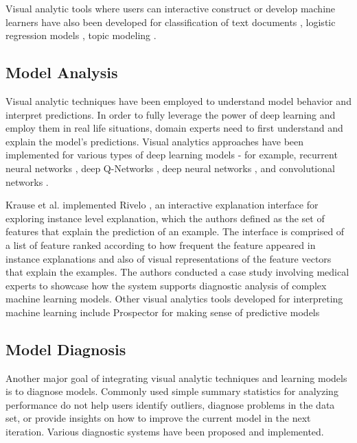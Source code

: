 Visual analytic tools where users can interactive construct or develop machine learners have also been developed for classification of text documents \cite{ClassifyText}, logistic regression models \cite{LogReg}, topic modeling \cite{TopicModeling}.

\subsection{ Model Analysis }
Visual analytic techniques have been employed to understand model behavior and interpret predictions. In order to fully leverage the power of deep learning and employ them in real life situations, domain experts need to first understand and explain the model's predictions. Visual analytics approaches have been implemented for various types of deep learning models - for example, recurrent neural networks \cite{RetainVis}, deep Q-Networks \cite{DQNViz}, deep neural networks \cite{UnderstandingNN}, and convolutional networks \cite{CNN}. 

Krause et al. implemented Rivelo \cite{Tamagnini}, an interactive explanation interface for exploring instance level explanation, which the authors defined as the set of features that explain the prediction of an example. The interface is comprised of a list of feature ranked according to how frequent the feature appeared in instance explanations and also of visual representations of the feature vectors that explain the examples. The authors conducted a case study involving medical experts to showcase how the system supports diagnostic analysis of complex machine learning models. Other visual analytics tools developed for interpreting machine learning include Prospector \cite{Prospector} for making sense of predictive models 

\subsection{Model Diagnosis}
Another major goal of integrating visual analytic techniques and learning models is to diagnose models. Commonly used simple summary statistics for analyzing performance do not help users identify outliers, diagnose problems in the data set, or provide insights on how to improve the current model in the next iteration. Various diagnostic systems have been proposed and implemented.

